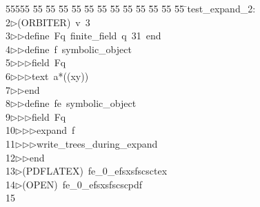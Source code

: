 %
%
\begin{tabbing}
55555 \= 55 \= 55 \= 55 \= 55 \= 55 \= 55 \= 55 \= 55 \= 55 \= 55 \= 55 \= 55 \= \>test\_expand\_2:\\[0pt]
2\>$\triangleright$\>(ORBITER)\ v\ 3\ \\[0pt]
3\>$\triangleright$\>$\triangleright$\>define\ Fq\ finite\_field\ q\ 31\ end\ \\[0pt]
4\>$\triangleright$\>$\triangleright$\>define\ f\ symbolic\_object\ \\[0pt]
5\>$\triangleright$\>$\triangleright$\>$\triangleright$\>field\ Fq\ \\[0pt]
6\>$\triangleright$\>$\triangleright$\>$\triangleright$\>text\ a*((xy))\ \\[0pt]
7\>$\triangleright$\>$\triangleright$\>end\ \\[0pt]
8\>$\triangleright$\>$\triangleright$\>define\ fe\ symbolic\_object\ \\[0pt]
9\>$\triangleright$\>$\triangleright$\>$\triangleright$\>field\ Fq\ \\[0pt]
10\>$\triangleright$\>$\triangleright$\>$\triangleright$\>expand\ f\ \\[0pt]
11\>$\triangleright$\>$\triangleright$\>$\triangleright$\>write\_trees\_during\_expand\ \\[0pt]
12\>$\triangleright$\>$\triangleright$\>end\\[0pt]
13\>$\triangleright$\>(PDFLATEX)\ fe\_0\_efsxsfscsctex\\[0pt]
14\>$\triangleright$\>(OPEN)\ fe\_0\_efsxsfscscpdf\\[0pt]
15\>\end{tabbing}
